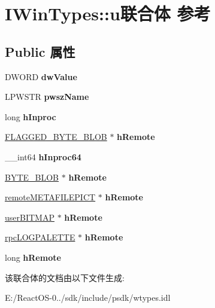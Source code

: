 \hypertarget{union_i_win_types_1_1u}{}\section{I\+Win\+Types\+:\+:u联合体 参考}
\label{union_i_win_types_1_1u}
\subsection*{Public 属性}
\begin{DoxyCompactItemize}
\item 
\mbox{\label{union_i_win_types_1_1u_aeaf5c0679407cdeca5e95b966632e3c9}} 
D\+W\+O\+RD {\bfseries dw\+Value}
\item 
\mbox{\label{union_i_win_types_1_1u_aade541c28e36ee2d74727cd3a7b8a2b1}} 
L\+P\+W\+S\+TR {\bfseries pwsz\+Name}
\item 
\mbox{\label{union_i_win_types_1_1u_aa854a23f11cd4b8c746254b0f22f3b49}} 
long {\bfseries h\+Inproc}
\item 
\mbox{\label{union_i_win_types_1_1u_a782441647522ebc3ea326f0eddc163bc}} 
\hyperlink{struct_i_win_types_1_1___f_l_a_g_g_e_d___b_y_t_e___b_l_o_b}{F\+L\+A\+G\+G\+E\+D\+\_\+\+B\+Y\+T\+E\+\_\+\+B\+L\+OB} $\ast$ {\bfseries h\+Remote}
\item 
\mbox{\label{union_i_win_types_1_1u_ae3cda6f6816de0745b62f3afbb7faf73}} 
\+\_\+\+\_\+int64 {\bfseries h\+Inproc64}
\item 
\mbox{\label{union_i_win_types_1_1u_a4b0173a04129bc0c2d7b0ed788ee3fb7}} 
\hyperlink{struct_i_win_types_1_1___b_y_t_e___b_l_o_b}{B\+Y\+T\+E\+\_\+\+B\+L\+OB} $\ast$ {\bfseries h\+Remote}
\item 
\mbox{\label{union_i_win_types_1_1u_ac6cc963c09a3298924bdfa70a10923d7}} 
\hyperlink{struct_i_win_types_1_1__remote_m_e_t_a_f_i_l_e_p_i_c_t}{remote\+M\+E\+T\+A\+F\+I\+L\+E\+P\+I\+CT} $\ast$ {\bfseries h\+Remote}
\item 
\mbox{\label{union_i_win_types_1_1u_a542e8c4041e64a282ae112c215771f0c}} 
\hyperlink{struct_i_win_types_1_1__user_b_i_t_m_a_p}{user\+B\+I\+T\+M\+AP} $\ast$ {\bfseries h\+Remote}
\item 
\mbox{\label{union_i_win_types_1_1u_a428d29a545d6336354898fb74b95576b}} 
\hyperlink{struct_i_win_types_1_1tagrpc_l_o_g_p_a_l_e_t_t_e}{rpc\+L\+O\+G\+P\+A\+L\+E\+T\+TE} $\ast$ {\bfseries h\+Remote}
\item 
\mbox{\label{union_i_win_types_1_1u_a57a474919fbe438f577898e1cbab4646}} 
long {\bfseries h\+Remote}
\end{DoxyCompactItemize}


该联合体的文档由以下文件生成\+:\begin{DoxyCompactItemize}
\item 
E\+:/\+React\+O\+S-\/0../sdk/include/psdk/wtypes.\+idl\end{DoxyCompactItemize}
